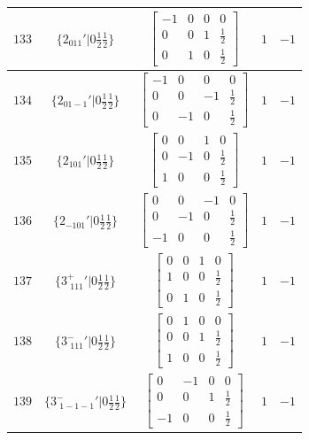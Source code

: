 \documentclass[fleqn,8pt]{jsarticle}
\begin{document}
\begin{longtable}{ccccc}
$ 133 $ & $ \{2{}_{011}{}'|0 \frac{1}{2} \frac{1}{2}\} $ & $ \begin{bmatrix} -1 & 0 & 0 & 0 \\ 0 & 0 & 1 & \frac{1}{2} \\ 0 & 1 & 0 & \frac{1}{2} \end{bmatrix} $ & $ 1 $ & $ -1 $ \\ \hline
$ 134 $ & $ \{2{}_{01-1}{}'|0 \frac{1}{2} \frac{1}{2}\} $ & $ \begin{bmatrix} -1 & 0 & 0 & 0 \\ 0 & 0 & -1 & \frac{1}{2} \\ 0 & -1 & 0 & \frac{1}{2} \end{bmatrix} $ & $ 1 $ & $ -1 $ \\ \hline
$ 135 $ & $ \{2{}_{101}{}'|0 \frac{1}{2} \frac{1}{2}\} $ & $ \begin{bmatrix} 0 & 0 & 1 & 0 \\ 0 & -1 & 0 & \frac{1}{2} \\ 1 & 0 & 0 & \frac{1}{2} \end{bmatrix} $ & $ 1 $ & $ -1 $ \\ \hline
$ 136 $ & $ \{2{}_{-101}{}'|0 \frac{1}{2} \frac{1}{2}\} $ & $ \begin{bmatrix} 0 & 0 & -1 & 0 \\ 0 & -1 & 0 & \frac{1}{2} \\ -1 & 0 & 0 & \frac{1}{2} \end{bmatrix} $ & $ 1 $ & $ -1 $ \\ \hline
$ 137 $ & $ \{3^{+}_{\,\,111}{}'|0 \frac{1}{2} \frac{1}{2}\} $ & $ \begin{bmatrix} 0 & 0 & 1 & 0 \\ 1 & 0 & 0 & \frac{1}{2} \\ 0 & 1 & 0 & \frac{1}{2} \end{bmatrix} $ & $ 1 $ & $ -1 $ \\ \hline
$ 138 $ & $ \{3^{-}_{\,\,111}{}'|0 \frac{1}{2} \frac{1}{2}\} $ & $ \begin{bmatrix} 0 & 1 & 0 & 0 \\ 0 & 0 & 1 & \frac{1}{2} \\ 1 & 0 & 0 & \frac{1}{2} \end{bmatrix} $ & $ 1 $ & $ -1 $ \\ \hline
$ 139 $ & $ \{3^{-}_{\,\,1-1-1}{}'|0 \frac{1}{2} \frac{1}{2}\} $ & $ \begin{bmatrix} 0 & -1 & 0 & 0 \\ 0 & 0 & 1 & \frac{1}{2} \\ -1 & 0 & 0 & \frac{1}{2} \end{bmatrix} $ & $ 1 $ & $ -1 $ \\ \hline

\end{longtable}
\end{document}

